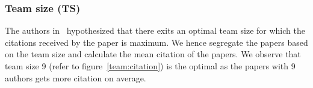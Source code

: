 \subsubsection*{Team size (TS)}
The authors in~\cite{chakraborty2014towards} hypothesized that there exits an optimal team size for which the citations received by the paper is maximum. We hence segregate the papers based on the team size and calculate the mean citation of the papers. We observe that team size 9 (refer to figure~\ref{team:citation}) is the optimal as the papers with 9 authors gets more citation on average.

\medskip